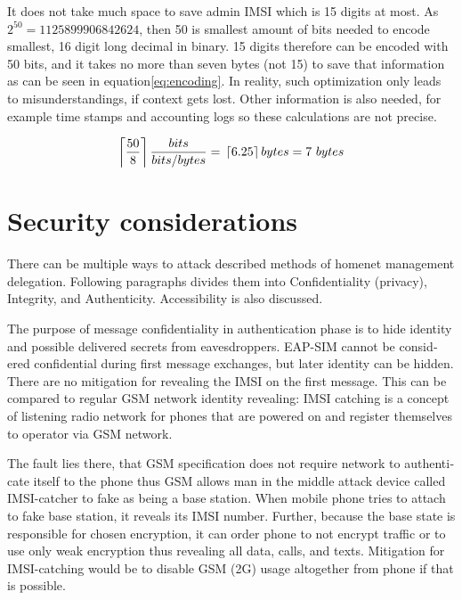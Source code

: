 \documentclass[12pt,a4paper,english]{tutthesis}
\begin{document}
\begin{otherlanguage}{english}
It does not take much space to save admin IMSI which is 15 digits at
most. 
As $2^{50} = 1125899906842624$,
then 50 is smallest amount of bits needed to encode smallest, 16 digit long
decimal in binary. 15 digits therefore can be encoded with
50 bits,  and it takes no more than seven bytes (not 15) to save that
information as can be seen in equation\ref{eq:encoding}.
In reality, such optimization only leads to misunderstandings, if
context gets lost. Other information is also needed, for example
time stamps and accounting logs so these calculations are not precise.

\begin{equation}
 \label{eq:encoding}
  \left \lceil \frac{50}8 \right \rceil \frac{bits}{bits/bytes} = \\
   \left \lceil 6.25 \right \rceil bytes = 7~{}bytes
\end{equation}


\section{Security considerations}
\label{sec-6-5}



There can be multiple ways to attack described methods of
homenet management delegation. Following paragraphs divides them into
Confidentiality (privacy), Integrity, and
Authenticity. Accessibility is also discussed.


The purpose of message confidentiality in authentication phase is
to hide identity and possible delivered secrets from
eavesdroppers. EAP-SIM cannot be considered confidential during 
first message exchanges, but later identity can be hidden.
There are no mitigation for revealing the IMSI on the first message.
This can be compared to regular GSM network identity revealing: IMSI
catching is a concept of listening radio network for phones that are
powered on and register themselves to operator via GSM network.  

The
fault lies there, that GSM specification does not require network to
authenticate itself to the phone thus GSM allows man in the middle
attack device called IMSI-catcher to fake as being a base station.
When mobile phone tries to attach to fake base station, it reveals its
IMSI number. Further, because the base state is responsible for chosen
encryption, it can order phone to not encrypt traffic or to use only
weak encryption thus revealing all data, calls, and
texts\cite{imsi-heise}. Mitigation for IMSI-catching would be to
disable GSM (2G) usage altogether from phone if that is possible.





\end{otherlanguage}
\end{document}
